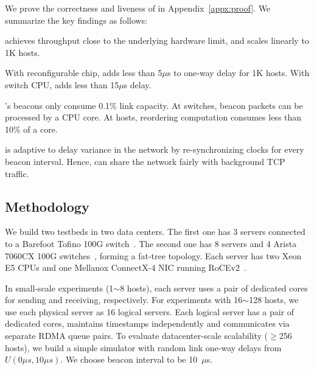 We prove the correctness and liveness of \sys in Appendix~\ref{appx:proof}. We summarize the key findings as follows:


\sys achieves throughput close to the underlying hardware limit, and scales linearly to 1K hosts.

With reconfigurable chip, \sys adds less than 5$\mu$s to one-way delay for 1K hosts. With switch CPU, \sys adds less than 15$\mu$s delay.

\sys's beacons only consume 0.1\% link capacity. At switches, beacon packets can be processed by a CPU core. At hosts, reordering computation consumes less than 10\% of a core.

\sys is adaptive to delay variance in the network by re-synchronizing clocks for every beacon interval. Hence, \sys can share the network fairly with background TCP traffic.

\subsection{Methodology}
\label{sec:testbed}

We build two testbeds in two data centers.
The first one has 3 servers connected to a Barefoot Tofino 100G switch~\cite{tofino}.
The second one has 8 servers and 4 Arista 7060CX 100G switches~\cite{arista}, forming a fat-tree topology.
Each server has two Xeon E5 CPUs and one Mellanox ConnectX-4 NIC running RoCEv2~\cite{infinibandrocev2}.


In small-scale experiments (1$\sim$8 hosts), each server uses a pair of dedicated cores for sending and receiving, respectively.
For experiments with 16$\sim$128 hosts, we use each physical server as 16 logical servers. Each logical server has a pair of dedicated cores, maintains timestamps independently and communicates via separate RDMA queue pairs.
To evaluate datacenter-scale scalability ($\ge$256 hosts), we build a simple simulator with random link one-way delays from $U(0\mu s,10\mu s)$.
We choose beacon interval to be 10~$\mu$s.


